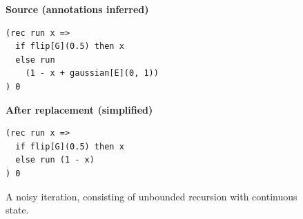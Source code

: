 \begin{figure}[htbp]
\centering
\begin{minipage}[t]{.48\linewidth}
\raggedright\textbf{Source (annotations inferred)}
\begin{lstlisting}[xleftmargin=0pt]
(rec run x =>
  if flip[G](0.5) then x
  else run
    (1 - x + gaussian[E](0, 1))
) 0
\end{lstlisting}
\end{minipage}\hfill
\begin{minipage}[t]{.48\linewidth}
\raggedright\textbf{After replacement (simplified)}
\begin{lstlisting}[xleftmargin=0pt]
(rec run x =>
  if flip[G](0.5) then x
  else run (1 - x)
) 0
\end{lstlisting}
\end{minipage}
\caption{A noisy iteration, consisting of unbounded recursion with continuous state.}
\label{fig:intro-exact}
\end{figure}
